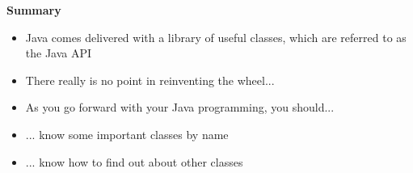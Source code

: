 \documentclass{beamer}
\begin{document}
\begin{frame}
\begin{center}
\textbf{Summary}
\end{center}
\begin{itemize}
\item Java comes delivered with a library of useful classes, which are referred to as the Java API 
\item There really is no point in reinventing the wheel...
\end{itemize}
\end{frame} 

\begin{frame}
\begin{itemize}
\item As you go forward with your Java programming, you should...
\bigskip
\item ... know some important classes by name
\item ... know how to find out about other classes
\end{itemize}
\end{frame} 
\end{document}
